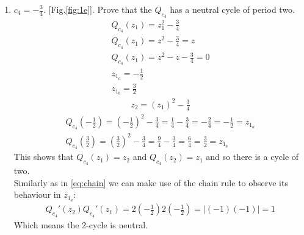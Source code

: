 \documentclass[11pt]{article}
\begin{document}
\begin{enumerate}[label=(\alph{*})]
    \item $c_4 = -\frac{3}{4}$. [Fig.\ref{fig:1e}]. Prove that the $Q_{c_4}$ has a neutral cycle of period two.\\
    \begin{equation}
        \begin{split}
            Q_{c_4}(z_1) = z^2_1 - \frac{3}{4}\\
            Q_{c_4}(z_1) = z^2 - \frac{3}{4} = z\\
            Q_{c_4}(z_1) = z^2 - z - \frac{3}{4} = 0\\
            z_{1_a} = -\frac{1}{2} \\ z_{1_b} = \frac{3}{2}
        \end{split}
    \end{equation}
    \begin{equation}
        \begin{split}
        z_2 = (z_1)^2 - \frac{3}{4}
        \end{split}
    \end{equation}
    \begin{equation}
        \begin{split}
            Q_{c_4}\left(-\frac{1}{2}\right) = \left(-\frac{1}{2}\right)^2 - \frac{3}{4} = \frac{1}{4} - \frac{3}{4} = -\frac{2}{4} = - \frac{1}{2} = z_{1_a}\\
            Q_{c_4}\left(\frac{3}{2}\right) = \left(\frac{3}{2}\right)^2 - \frac{3}{4} = \frac{9}{4} - \frac{3}{4} = \frac{6}{4} = \frac{3}{2} = z_{1_b}
        \end{split}
    \end{equation}
    This shows that $Q_{c_4}(z_1) = z_2$ and $Q_{c_4}(z_2) = z_1$ and so there is a cycle of two.\\
    Similarly as in \ref{eq:chain} we can make use of the chain rule to observe its behaviour in $z_{1_a}$:
    \begin{equation}
        \begin{split}
            Q_{c_4}'(z_2)Q_{c_4}'(z_1) = 2\left(-\frac{1}{2}\right) 2\left(-\frac{1}{2}\right) = |(-1)(-1)| = 1
        \end{split}
    \end{equation}
    Which means the 2-cycle is neutral.
\end{enumerate}
\vspace{0.5cm}


\pagebreak
\end{document}
